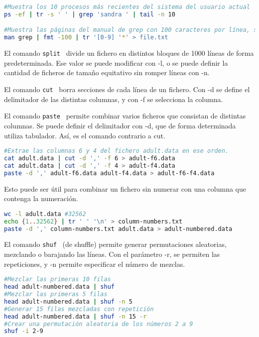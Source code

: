 \begin{lstlisting}[language=bash]
#Muestra los 10 procesos más recientes del sistema del usuario actual
ps -ef | tr -s ' ' | grep 'sandra ' | tail -n 10

#Muestra las páginas del manual de grep con 100 caracteres por línea, sustituyendo los dígitos por asteriscos y redireccionando a un fichero
man grep | fmt -100 | tr '[0-9] '*' > file.txt
\end{lstlisting}

El comando \texttt{split}  \  divide un fichero en distintos bloques de 1000 líneas de forma predeterminada. Ese valor se puede modificar con -l, o se puede definir la cantidad de ficheros de tamaño equitativo sin romper líneas con -n.

El comando \texttt{cut}  \ borra secciones de cada línea de un fichero. Con -d se define el delimitador de las distintas columnas, y con -f se selecciona la columna.

El comando \texttt{paste}  \ permite combinar varios ficheros que consistan de distintas columnas. Se puede definir el delimitador con -d, que de forma determinada utiliza tabulador. Así, es el comando contrario a cut. 

\begin{lstlisting}[language=bash]
#Extrae las columnas 6 y 4 del fichero adult.data en ese orden.
cat adult.data | cut -d ',' -f 6 > adult-f6.data
cat adult.data | cut -d ',' -f 4 > adult-f4.data
paste -d ',' adult-f6.data adult-f4.data > adult-f6-f4.data
\end{lstlisting}

Esto puede ser útil para combinar un fichero sin numerar con una columna que contenga la numeración.
\begin{lstlisting}[language=bash]
wc -l adult.data #32562
echo {1..32562} | tr ' ' '\n' > column-numbers.txt
paste -d ',' column-numbers.txt adult.data > adult-numbered.data
\end{lstlisting}

El comando \texttt{shuf}  \  (de shuffle) permite generar permutaciones aleatorias, mezclando o barajando las líneas. Con el parámetro -r, se permiten las repeticiones, y -n permite especificar el número de mezclas.
\begin{lstlisting}[language=bash]
#Mezclar las primeras 10 filas
head adult-numbered.data | shuf
#Mezclar las primeras 5 filas
head adult-numbered.data | shuf -n 5
#Generar 15 filas mezcladas con repetición
head adult-numbered.data | shuf -n 15 -r
#Crear una permutación aleatoria de los números 2 a 9
shuf -i 2-9
\end{lstlisting}
 
